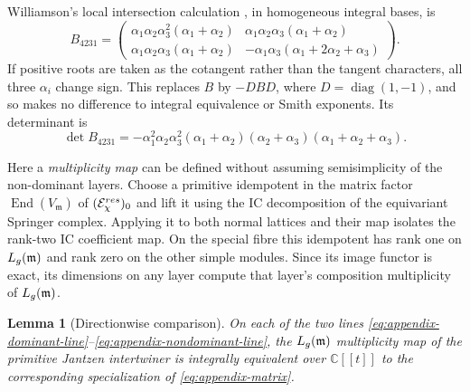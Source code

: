 \documentclass[10pt,a4paper]{amsart}
\newtheorem{lemma}[theorem]{Lemma}
\begin{document}
Williamson's local intersection calculation
\cite[Section~8.3]{WilliamsonLocal}, in homogeneous integral bases, is
\begin{equation}\label{eq:appendix-matrix}
 B_{4231}=\begin{pmatrix}
 \alpha_1\alpha_2\alpha_3^2(\alpha_1+\alpha_2)&
 \alpha_1\alpha_2\alpha_3(\alpha_1+\alpha_2)\\
 \alpha_1\alpha_2\alpha_3(\alpha_1+\alpha_2)&
 -\alpha_1\alpha_3(\alpha_1+2\alpha_2+\alpha_3)
 \end{pmatrix}.
\end{equation}
If positive roots are taken as the cotangent rather than the tangent
characters, all three $\alpha_i$ change sign.  This replaces $B$ by
$-DBD$, where $D=\operatorname{diag}(1,-1)$, and so makes no difference
to integral equivalence or Smith exponents.  Its determinant is
\begin{equation}\label{eq:appendix-det}
 \det B_{4231}=-\alpha_1^2\alpha_2\alpha_3^2
 (\alpha_1+\alpha_2)(\alpha_2+\alpha_3)
 (\alpha_1+\alpha_2+\alpha_3).
\end{equation}

Here a \emph{multiplicity map} can be defined without assuming
semisimplicity of the non-dominant layers.  Choose a primitive idempotent
in the matrix factor $\operatorname{End}(V_{\mathfrak m})$ of
$(\mathcal E_\chi^{\rm res})_0$ and lift it using the IC decomposition
of the equivariant Springer complex.  Applying it to both normal
lattices and their map isolates the rank-two IC coefficient map.
On the special fibre this idempotent has rank one on
$L_{\rm g}(\mathfrak m)$ and rank zero on the other simple modules.
Since its image functor is exact, its dimensions on any layer compute
that layer's composition multiplicity of $L_{\rm g}(\mathfrak m)$.

\begin{lemma}[Directionwise comparison]\label{lem:appendix-transport}
On each of the two lines
\eqref{eq:appendix-dominant-line}--\eqref{eq:appendix-nondominant-line},
the $L_{\rm g}(\mathfrak m)$ multiplicity map of the primitive
Jantzen intertwiner is integrally equivalent over $\mathbb C[[t]]$
to the corresponding specialization of \eqref{eq:appendix-matrix}.
\end{lemma}
\end{document}
